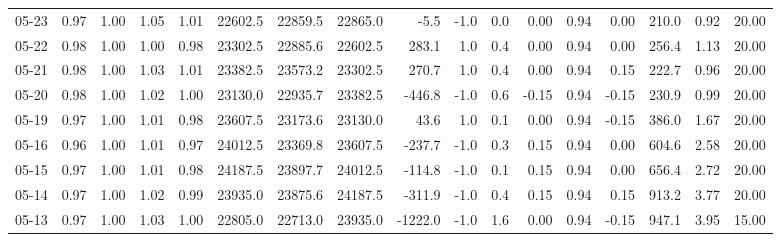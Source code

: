 \begin{threeparttable}
{\begin{tabular}{lrrrrrrrrrrrrrrrr}
  05-23 &         0.97 &           1.00 &          1.05 &          1.01 & 22602.5 & 22859.5 & 22865.0 &       -5.5 &                     -1.0 &                 0.0 &       0.00 &      0.94 &           0.00 &            210.0 &            0.92 &                  20.00 \\
  05-22 &         0.98 &           1.00 &          1.00 &          0.98 & 23302.5 & 22885.6 & 22602.5 &      283.1 &                      1.0 &                 0.4 &       0.00 &      0.94 &           0.00 &            256.4 &            1.13 &                  20.00 \\
  05-21 &         0.98 &           1.00 &          1.03 &          1.01 & 23382.5 & 23573.2 & 23302.5 &      270.7 &                      1.0 &                 0.4 &       0.00 &      0.94 &           0.15 &            222.7 &            0.96 &                  20.00 \\
  05-20 &         0.98 &           1.00 &          1.02 &          1.00 & 23130.0 & 22935.7 & 23382.5 &     -446.8 &                     -1.0 &                 0.6 &      -0.15 &      0.94 &          -0.15 &            230.9 &            0.99 &                  20.00 \\
  05-19 &         0.97 &           1.00 &          1.01 &          0.98 & 23607.5 & 23173.6 & 23130.0 &       43.6 &                      1.0 &                 0.1 &       0.00 &      0.94 &          -0.15 &            386.0 &            1.67 &                  20.00 \\
  05-16 &         0.96 &           1.00 &          1.01 &          0.97 & 24012.5 & 23369.8 & 23607.5 &     -237.7 &                     -1.0 &                 0.3 &       0.15 &      0.94 &           0.00 &            604.6 &            2.58 &                  20.00 \\
  05-15 &         0.97 &           1.00 &          1.01 &          0.98 & 24187.5 & 23897.7 & 24012.5 &     -114.8 &                     -1.0 &                 0.1 &       0.15 &      0.94 &           0.00 &            656.4 &            2.72 &                  20.00 \\
  05-14 &         0.97 &           1.00 &          1.02 &          0.99 & 23935.0 & 23875.6 & 24187.5 &     -311.9 &                     -1.0 &                 0.4 &       0.15 &      0.94 &           0.15 &            913.2 &            3.77 &                  20.00 \\
  05-13 &         0.97 &           1.00 &          1.03 &          1.00 & 22805.0 & 22713.0 & 23935.0 &    -1222.0 &                     -1.0 &                 1.6 &       0.00 &      0.94 &          -0.15 &            947.1 &            3.95 &                  15.00 \\

\end{tabular}}
\end{threeparttable}
